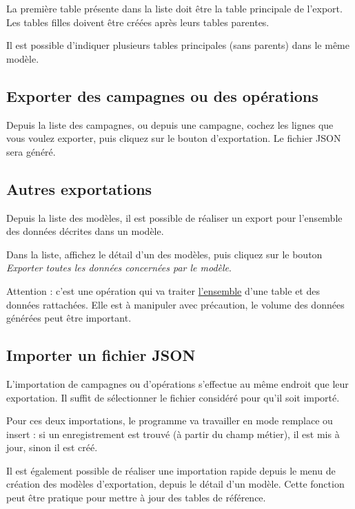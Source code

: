 La première table présente dans la liste doit être la table principale de l'export. Les tables filles doivent être créées après leurs tables parentes.

Il est possible d'indiquer plusieurs tables principales (sans parents) dans le même modèle.

\subsection{Exporter des campagnes ou des opérations}

Depuis la liste des campagnes, ou depuis une campagne, cochez les lignes que vous voulez exporter, puis cliquez sur le bouton d'exportation. Le fichier JSON sera généré.

\subsection{Autres exportations}

Depuis la liste des modèles, il est possible de réaliser un export pour l'ensemble des données décrites dans un modèle.

Dans la liste, affichez le détail d'un des modèles, puis cliquez sur le bouton \textit{Exporter toutes les données concernées par le modèle}.

Attention : c'est une opération qui va traiter \underline{l'ensemble} d'une table et des données rattachées. Elle est à manipuler avec précaution, le volume des données générées peut être important.

\subsection{Importer un fichier JSON}

L'importation de campagnes ou d'opérations s'effectue au même endroit que leur exportation. Il suffit de sélectionner le fichier considéré pour qu'il soit importé.

Pour ces deux importations, le programme va travailler en mode \og remplace ou insert \fg{} : si un enregistrement est trouvé (à partir du champ métier), il est mis à jour, sinon il est créé.

Il est également possible de réaliser une importation rapide depuis le menu de création des modèles d'exportation, depuis le détail d'un modèle. Cette fonction peut être pratique pour mettre à jour des tables de référence.